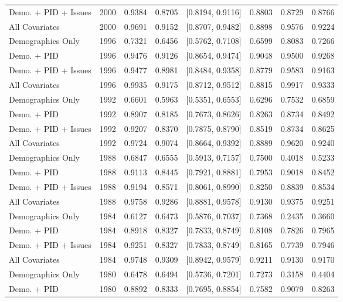 \begin{longtable}{lrrrlrrr}
  Demo. + PID + Issues & 2000 & 0.9384 & 0.8705 & [0.8194, 0.9116] & 0.8803 & 0.8729 & 0.8766 \\ 
  All Covariates & 2000 & 0.9691 & 0.9152 & [0.8707, 0.9482] & 0.8898 & 0.9576 & 0.9224 \\ 
  Demographics Only & 1996 & 0.7321 & 0.6456 & [0.5762, 0.7108] & 0.6599 & 0.8083 & 0.7266 \\ 
  Demo. + PID & 1996 & 0.9476 & 0.9126 & [0.8654, 0.9474] & 0.9048 & 0.9500 & 0.9268 \\ 
  Demo. + PID + Issues & 1996 & 0.9477 & 0.8981 & [0.8484, 0.9358] & 0.8779 & 0.9583 & 0.9163 \\ 
  All Covariates & 1996 & 0.9935 & 0.9175 & [0.8712, 0.9512] & 0.8815 & 0.9917 & 0.9333 \\ 
  Demographics Only & 1992 & 0.6601 & 0.5963 & [0.5351, 0.6553] & 0.6296 & 0.7532 & 0.6859 \\ 
  Demo. + PID & 1992 & 0.8907 & 0.8185 & [0.7673, 0.8626] & 0.8263 & 0.8734 & 0.8492 \\ 
  Demo. + PID + Issues & 1992 & 0.9207 & 0.8370 & [0.7875, 0.8790] & 0.8519 & 0.8734 & 0.8625 \\ 
  All Covariates & 1992 & 0.9724 & 0.9074 & [0.8664, 0.9392] & 0.8889 & 0.9620 & 0.9240 \\ 
  Demographics Only & 1988 & 0.6847 & 0.6555 & [0.5913, 0.7157] & 0.7500 & 0.4018 & 0.5233 \\ 
  Demo. + PID & 1988 & 0.9113 & 0.8445 & [0.7921, 0.8881] & 0.7953 & 0.9018 & 0.8452 \\ 
  Demo. + PID + Issues & 1988 & 0.9194 & 0.8571 & [0.8061, 0.8990] & 0.8250 & 0.8839 & 0.8534 \\ 
  All Covariates & 1988 & 0.9758 & 0.9286 & [0.8881, 0.9578] & 0.9130 & 0.9375 & 0.9251 \\ 
  Demographics Only & 1984 & 0.6127 & 0.6473 & [0.5876, 0.7037] & 0.7368 & 0.2435 & 0.3660 \\ 
  Demo. + PID & 1984 & 0.8918 & 0.8327 & [0.7833, 0.8749] & 0.8108 & 0.7826 & 0.7965 \\ 
  Demo. + PID + Issues & 1984 & 0.9251 & 0.8327 & [0.7833, 0.8749] & 0.8165 & 0.7739 & 0.7946 \\ 
  All Covariates & 1984 & 0.9748 & 0.9309 & [0.8942, 0.9579] & 0.9211 & 0.9130 & 0.9170 \\ 
  Demographics Only & 1980 & 0.6478 & 0.6494 & [0.5736, 0.7201] & 0.7273 & 0.3158 & 0.4404 \\ 
  Demo. + PID & 1980 & 0.8892 & 0.8333 & [0.7695, 0.8854] & 0.7582 & 0.9079 & 0.8263 \\ 

\end{longtable}
